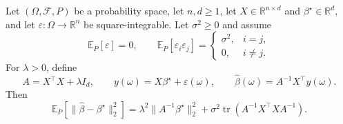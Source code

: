 \begin{theorem}
Let $(\Omega,\mathcal F,P)$ be a probability space, let $n,d\ge1$, let
$X\in\mathbb R^{n\times d}$ and $\beta^\star\in\mathbb R^d$, and let
$\varepsilon:\Omega\to\mathbb R^n$ be square-integrable.  Let
$\sigma^2\ge0$ and assume
\[
  \mathbb E_P[\varepsilon]=0,
  \qquad
  \mathbb E_P[\varepsilon_i\varepsilon_j]
  =\begin{cases}\sigma^2,&i=j,\\0,&i\ne j.\end{cases}
\]
For $\lambda>0$, define
\[
  A=X^\top X+\lambda I_d,
  \qquad y(\omega)=X\beta^\star+\varepsilon(\omega),
  \qquad
  \widehat\beta(\omega)=A^{-1}X^\top y(\omega).
\]
Then
\[
  \mathbb E_P\!\left[\|\widehat\beta-\beta^\star\|_2^2\right]
  =\lambda^2\|A^{-1}\beta^\star\|_2^2
   +\sigma^2\operatorname{tr}
      \!\left(A^{-1}X^\top X A^{-1}\right).
\]
\end{theorem}
